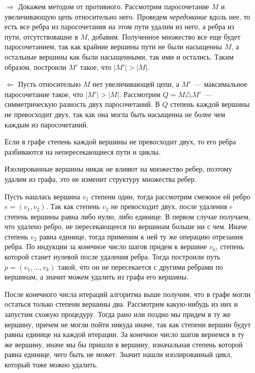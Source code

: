 \Proof 
\begin{itemize}
    \item[$\Longrightarrow$] Докажем методом от противного. Рассмотрим паросочетание $M$ и увеличивающую цепь относительно него. Проведем \emph{чередование} вдоль нее, то есть все ребра из паросочетания на этом пути удалим из него, а ребра из пути, отсутствовашие в $M$, добавим. Полученное множество все еще будет паросочетанием, так как крайние вершины пути не были насыщенны $M$, а остальные вершины как были насыщенными, так ими и остались. Таким образом, построили $M'$ такое, что $|M'| > |M|$.
    \item[$\Longleftarrow$] Пусть относительно $M$ нет увеличивающей цепи, а $M'$~--- максимальное паросочетание такое, что $|M'| > |M|$. Рассмотрим $Q = M \triangle M'$~--- симметрическую разность двух паросочетаний. В $Q$ степень каждой вершины не превосходит двух, так как она могла быть насыщенна не более чем каждым из паросочетаний.
    
    \Lemma Если в графе степень каждой вершины не превосходит двух, то его ребра разбиваются на непересекающиеся пути и циклы.
    
    \Proof Изолированные вершины никак не влияют на множество ребер, поэтому удалим из графа, это не изменит структуру множества ребер.
    
    Пусть нашлась вершина $v_1$ степени один, тогда рассмотрим смежное ей ребро $e = (v_1, v_2)$. Так как степень $v_2$ не превосходит двух, после удаления $e$ степень вершины равна либо нулю, либо единице. В первом случае получаем, что удалено ребро, не пересекающееся по вершинам больше ни с чем. Иначе степень $v_2$ равна единице, тогда применим к ней ту же операцию отрезания ребра. По индукции за конечное число шагов придем к вершине $v_k$, степень которой станет нулевой после удаления ребра. Тогда построили путь $p = (v_1, \ldots, v_k)$ такой, что он не пересекается с другими ребрами по вершинам, а значит можем удалить из графа его вершины.
    
    После конечного числа итераций алгоритма выше получим, что в графе могли остаться только степени вершины два. Рассмотрим какую-нибудь из них и запустим схожую процедуру. Тогда рано или поздно мы придем в ту же вершину, причем не могли пойти никуда иначе, так как степени вершин будут равны единице на каждой итерации. За конечное число шагов вернемся в ту же вершину, иначе мы бы пришли в вершину, изначальная степень которой равна единице, чего быть не может. Значит нашли изолированный цикл, который тоже можно удалить.
    

\end{itemize}
